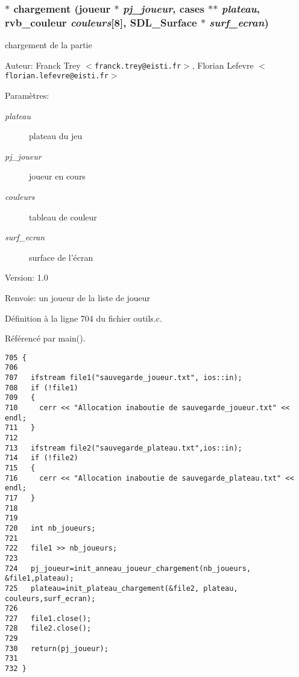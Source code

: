 \subsubsection{ $\ast$ chargement ({\bf joueur} $\ast$ {\em pj\_\-joueur}, {\bf cases} $\ast$$\ast$ {\em plateau}, {\bf rvb\_\-couleur} {\em couleurs}[8], SDL\_\-Surface $\ast$ {\em surf\_\-ecran})}\label{outils_8c_ae4beb88d7abebc4264362e2f1054e90}


chargement de la partie 

\begin{Desc}
\item[Auteur:]Franck Trey $<${\tt franck.trey@eisti.fr}$>$, Florian Lefevre $<${\tt florian.lefevre@eisti.fr}$>$\end{Desc}
\begin{Desc}
\item[Param\`{e}tres:]
\begin{description}
\item[{\em plateau}]plateau du jeu \item[{\em pj\_\-joueur}]joueur en cours \item[{\em couleurs}]tableau de couleur \item[{\em surf\_\-ecran}]surface de l'\'{e}cran\end{description}
\end{Desc}
\begin{Desc}
\item[Version:]1.0 \end{Desc}
\begin{Desc}
\item[Renvoie:]un joueur de la liste de joueur \end{Desc}


D\'{e}finition \`{a} la ligne 704 du fichier outils.c.

R\'{e}f\'{e}renc\'{e} par main().

\begin{Code}\begin{verbatim}705 {
706   
707   ifstream file1("sauvegarde_joueur.txt", ios::in);
708   if (!file1)
709   {
710     cerr << "Allocation inaboutie de sauvegarde_joueur.txt" << endl;
711   }
712   
713   ifstream file2("sauvegarde_plateau.txt",ios::in);
714   if (!file2)
715   {
716     cerr << "Allocation inaboutie de sauvegarde_plateau.txt" << endl;
717   }
718   
719   
720   int nb_joueurs;
721   
722   file1 >> nb_joueurs;
723   
724   pj_joueur=init_anneau_joueur_chargement(nb_joueurs, &file1,plateau);
725   plateau=init_plateau_chargement(&file2, plateau, couleurs,surf_ecran);
726   
727   file1.close();
728   file2.close();
729   
730   return(pj_joueur);
731 
732 }
\end{verbatim}\end{Code}


